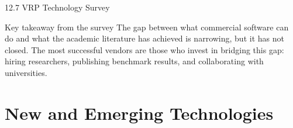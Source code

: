 \documentclass[aspectratio=169,10pt]{beamer}
\begin{document}
\begin{frame}[allowframebreaks]{12.7 \; VRP Technology Survey}
  \begin{alertblock}{Key takeaway from the survey}
    The gap between what commercial software can do and what the academic
    literature has achieved is narrowing, but it has not closed.
    The most successful vendors are those who invest in bridging this gap:
    hiring researchers, publishing benchmark results, and collaborating
    with universities.
  \end{alertblock}
\end{frame}

\section{New and Emerging Technologies}
\end{document}
